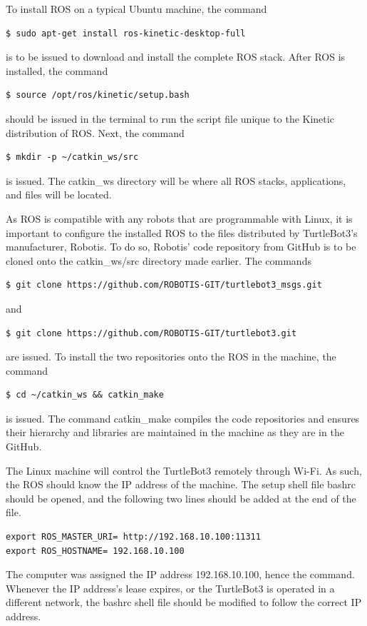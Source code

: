 \documentclass[12pt]{report}
\begin{document}
To install ROS on a typical Ubuntu machine, the command
\begin{verbatim}
$ sudo apt-get install ros-kinetic-desktop-full

\end{verbatim}
is to be issued to download and install the complete ROS stack. After ROS is installed, the command
\begin{verbatim}
$ source /opt/ros/kinetic/setup.bash

\end{verbatim}
should be issued in the terminal to run the script file unique to the Kinetic distribution of ROS. Next, the command
\begin{verbatim}
$ mkdir -p ~/catkin_ws/src

\end{verbatim}
is issued. The catkin\_ws directory will be where all ROS stacks, applications, and files will be located.\par
\vspace{1em}
As ROS is compatible with any robots that are programmable with Linux, it is important to configure the installed ROS to the files distributed by TurtleBot3’s manufacturer, Robotis. To do so, Robotis’ code repository from GitHub is to be cloned onto the catkin\_ws/src directory made earlier. The commands
\begin{verbatim}
$ git clone https://github.com/ROBOTIS-GIT/turtlebot3_msgs.git

\end{verbatim}
and
\begin{verbatim}
$ git clone https://github.com/ROBOTIS-GIT/turtlebot3.git

\end{verbatim}
are issued. To install the two repositories onto the ROS in the machine, the command
\begin{verbatim}
$ cd ~/catkin_ws && catkin_make

\end{verbatim}
is issued. The command catkin\_make compiles the code repositories and ensures their hierarchy and libraries are maintained in the machine as they are in the GitHub.\par
\vspace{1em}
The Linux machine will control the TurtleBot3 remotely through Wi-Fi. As such, the ROS should know the IP address of the machine. The setup shell file bashrc should be opened, and the following two lines should be added at the end of the file.
\begin{verbatim}
export ROS_MASTER_URI= http://192.168.10.100:11311
export ROS_HOSTNAME= 192.168.10.100

\end{verbatim}
The computer was assigned the IP address 192.168.10.100, hence the command. Whenever the IP address’s lease expires, or the TurtleBot3 is operated in a different network, the bashrc shell file should be modified to follow the correct IP address.\par
\end{document}
